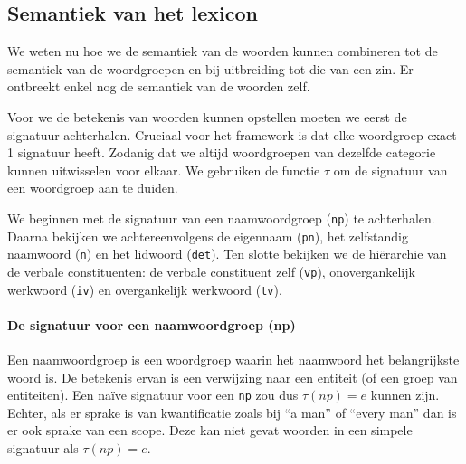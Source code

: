 
\subsection{Semantiek van het lexicon} We weten nu hoe we de semantiek van de woorden kunnen combineren tot de semantiek van de woordgroepen en bij uitbreiding tot die van een zin. Er ontbreekt enkel nog de semantiek van de woorden zelf.

Voor we de betekenis van woorden kunnen opstellen moeten we eerst de signatuur achterhalen. Cruciaal voor het framework is dat elke woordgroep exact 1 signatuur heeft. Zodanig dat we altijd woordgroepen van dezelfde categorie kunnen uitwisselen voor elkaar. We gebruiken de functie $\tau$ om de signatuur van een woordgroep aan te duiden.

We beginnen met de signatuur van een naamwoordgroep (\texttt{np}) te achterhalen. Daarna bekijken we achtereenvolgens de eigennaam (\texttt{pn}), het zelfstandig naamwoord (\texttt{n}) en het lidwoord (\texttt{det}). Ten slotte bekijken we de hiërarchie van de verbale constituenten: de verbale constituent zelf (\texttt{vp}), onovergankelijk werkwoord (\texttt{iv}) en overgankelijk werkwoord (\texttt{tv}).

\paragraph{De signatuur voor een naamwoordgroep (np)} Een naamwoordgroep is een woordgroep waarin het naamwoord het belangrijkste woord is. De betekenis ervan is een verwijzing naar een entiteit (of een groep van entiteiten). Een naïve signatuur voor een \texttt{np} zou dus $\tau(np) = e$ kunnen zijn. Echter, als er sprake is van kwantificatie zoals bij ``a man'' of ``every man'' dan is er ook sprake van een scope. Deze kan niet gevat woorden in een simpele signatuur als $\tau(np) = e$.

